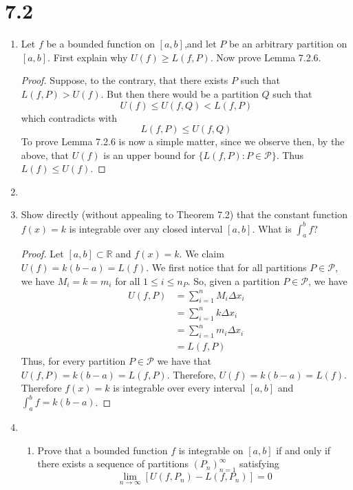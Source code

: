 \section*{7.2}
\begin{enumerate}
    \item Let \( f \) be a bounded function on \( [a,b] \),and let \( P \) be an arbitrary partition on \( [a,b] \). First explain why \( U(f) \geq L(f,P) \). Now prove Lemma 7.2.6.
    
    \begin{proof}
    Suppose, to the contrary, that there exists \( P \) such that \( L(f,P) > U(f) \). But then there would be a partition \( Q \) such that
    \[
    U(f) \leq U(f,Q) < L(f,P)
    \]
    which contradicts with 
    \[
    L(f,P) \leq U(f,Q)
    \]
    To prove Lemma 7.2.6 is now a simple matter, since we observe then, by the above, that \( U(f) \) is an upper bound for \( \{ L(f,P): P \in \mathcal{P} \} \). Thus \( L(f) \leq U(f) \).
    \end{proof}
    
    \item
    
    \item Show directly (without appealing to Theorem 7.2) that the constant function \( f(x) = k \) is integrable over any closed interval \( [a,b] \). What is \( \int_{a}^{b} f \)?
    
    \begin{proof}
    Let \( [a,b] \subset \mathbb{R} \) and \( f(x) = k \). We claim \( U(f) = k(b-a) = L(f)\). We first notice that for all partitions \( P \in \mathcal{P} \), we have \( M_i = k = m_i \) for all \( 1 \leq i \leq n_P \). So, given a partition \( P \in \mathcal{P} \), we have
    \begin{align*}
    U(f,P) &= \sum_{i=1}^{n} M_i \Delta x_i \\
    &= \sum_{i=1}^{n} k \Delta x_i \\
    &= \sum_{i=1}^{n} m_i \Delta x_i \\
    &= L(f,P)
    \end{align*}
    Thus, for every partition \( P \in \mathcal{P} \) we have that \( U(f,P) = k(b-a) = L(f,P) \). Therefore, \( U(f) = k(b-a) = L(f) \). Therefore \( f(x) = k \) is integrable over every interval \( [a,b] \) and \( \int_a^b f = k(b-a) \). 
    \end{proof}
    
    \item
    \begin{enumerate}
        \item Prove that a bounded function \( f \) is integrable on \( [a,b] \) if and only if there exists a sequence of partitions \( (P_n)_{n=1}^{\infty} \) satisfying
        \[
        \lim_{n \rightarrow \infty} [U(f,P_n) - L(f,P_n)]=0
        \]
        

\end{enumerate}
\end{enumerate}
